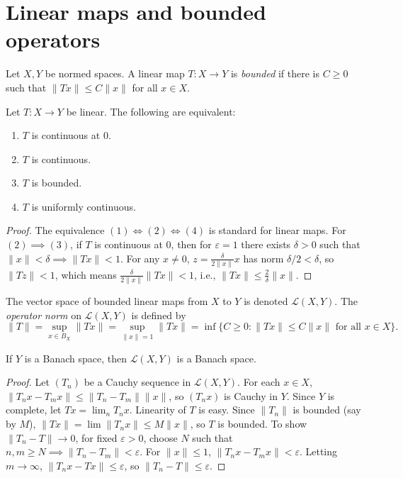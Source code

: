 \section{Linear maps and bounded operators}
\label{section-bounded-operators}

\begin{definition}
\label{definition-bounded-linear-map}
Let $X, Y$ be normed spaces. A linear map $T
: X \to Y$ is {\it bounded} if there is $C
\geq 0$ such that $\|Tx\| \leq C\|x\|$ for
all $x \in X$.
\end{definition}

\begin{proposition}
\label{proposition-bounded-iff-continuous}
Let $T : X \to Y$ be linear. The following
are equivalent:
\begin{enumerate}
\item $T$ is continuous at $0$.
\item $T$ is continuous.
\item $T$ is bounded.
\item $T$ is uniformly continuous.
\end{enumerate}
\end{proposition}

\begin{proof}
The equivalence $(1) \iff (2) \iff (4)$ is
standard for linear maps. For $(2) \implies
(3)$, if $T$ is continuous at $0$, then for
$\varepsilon=1$ there exists $\delta>0$ such
that $\|x\| < \delta \implies \|Tx\| < 1$.
For any $x \neq 0$, $z =
\frac{\delta}{2\|x\|}x$ has norm $\delta/2 <
\delta$, so $\|Tz\| < 1$, which means
$\frac{\delta}{2\|x\|}\|Tx\| < 1$, i.e.,
$\|Tx\| \leq \frac{2}{\delta}\|x\|$.
\end{proof}

\begin{definition}
\label{definition-operator-norm}
The vector space of bounded linear maps from
$X$ to $Y$ is denoted $\mathcal{L}(X, Y)$.
The {\it operator norm} on $\mathcal{L}(X,
Y)$ is defined by
$$
\|T\| = \sup_{x \in B_X} \|Tx\| =
\sup_{\|x\|=1} \|Tx\| = \inf \{ C \geq 0 :
\|Tx\| \leq C\|x\| \text{ for all } x \in X
\}.
$$
\end{definition}

\begin{proposition}
\label{proposition-operator-space-banach}
If $Y$ is a Banach space, then
$\mathcal{L}(X, Y)$ is a Banach space.
\end{proposition}

\begin{proof}
Let $(T_n)$ be a Cauchy sequence in
$\mathcal{L}(X, Y)$. For each $x \in X$,
$\|T_n x - T_m x\| \leq \|T_n - T_m\| \|x\|$,
so $(T_n x)$ is Cauchy in $Y$. Since $Y$ is
complete, let $Tx = \lim_n T_n x$. Linearity
of $T$ is easy. Since $\|T_n\|$ is bounded
(say by $M$), $\|Tx\| = \lim \|T_n x\| \leq
M\|x\|$, so $T$ is bounded. To show $\|T_n -
T\| \to 0$, for fixed $\varepsilon > 0$,
choose $N$ such that $n, m \geq N \implies
\|T_n - T_m\| < \varepsilon$. For $\|x\| \leq
1$, $\|T_n x - T_m x\| < \varepsilon$.
Letting $m \to \infty$, $\|T_n x - Tx\| \leq
\varepsilon$, so $\|T_n - T\| \leq
\varepsilon$.
\end{proof}

